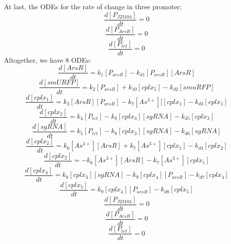 At last, the ODEs for the rate of change in three promoter:
\begin{equation}
\frac{d[P_{J23104}]}{dt}=0\tag{10}
\end{equation} 
\begin{equation}
\frac{d[P_{ArsR}]}{dt}=0\tag{11}
\end{equation} 
\begin{equation}
\frac{d[P_{tet}]}{dt}=0\tag{12}
\end{equation} 
Altogether, we have 8 ODEs:
\begin{equation}
\frac{d[ArsR]}{dt}=k_1[P_{arsR}]-k_{d1}[P_{arsR}][ArsR]\tag{1}
\end{equation}
\begin{equation}
\frac{d[smURFP]}{dt}=k_2[P_{arsR}]+k_{10}[cplx_5]-k_{d2}[smuRFP]\tag{2}
\end{equation}
\begin{equation}
\frac{d[cplx_1]}{dt}=k_3[ArsR][P_{arsR}]-k_7[As^{3+}][[cplx_1]-k_{d3}[cplx_1] \tag{3}
\end{equation}
\begin{equation}
\frac{d[cplx_3]}{dt}=k_4[P_{tet}]-k_{8}[cplx_3][sgRNA]-k_{d5}[cplx_3] \tag{4}
\end{equation}
\begin{equation}
\frac{d[sgRNA]}{dt}=k_5[P_{tet}]-k_{8}[cplx_3][sgRNA]-k_{d6}[sgRNA] \tag{5}
\end{equation}
\begin{equation}
\frac{d[cplx_2]}{dt}=k_{6}[As^{3+}][ArsR]+k_7[As^{3+}][cplx_1]-k_{d4}[cplx_2] \tag{6}
\end{equation}
\begin{equation}
\frac{d[cplx_2]}{dt}=-k_{6}[As^{3+}][ArsR]-k_7[As^{3+}][cplx_1] \tag{7}
\end{equation}
\begin{equation}
\frac{d[cplx_4]}{dt}=k_{8}[cplx_3][sgRNA]-k_{9}[cplx_4][P_{arsR}]-k_{d7}[cplx_4]\tag{8}
\end{equation}
\begin{equation}
\frac{d[cplx_5]}{dt}=k_{9}[cplx_4][P_{arsR}]-k_{d8}[cplx_5]\tag{9}
\end{equation} 
\begin{equation}
\frac{d[P_{J23104}]}{dt}=0\tag{10}
\end{equation} 
\begin{equation}
\frac{d[P_{ArsR}]}{dt}=0\tag{11}
\end{equation} 
\begin{equation}
\frac{d[P_{tet}]}{dt}=0\tag{12}
\end{equation} 
